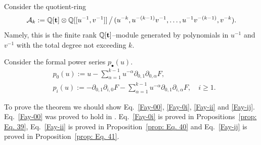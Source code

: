 \documentclass[12pt,a4paper]{amsart}
\newcommand{\QQ}{{\mathbb{Q}}}
\def\A{{\mathcal A}}
\newcommand{\p}{{\partial}}
\newcommand{\<}{\left<}
\renewcommand{\>}{\right>}
\newcommand{\bt}{{\bf t}}
\numberwithin{equation}{section}
\begin{document}
Consider the quotient-ring 
\[ 
\A_k := \QQ[\bt]\otimes\QQ[[u^{-1},v^{-1}]]\, \big/\, (u^{-k},u^{-(k-1)}v^{-1},  \dots, u^{-1}v^{-(k-1)},v^{-k}).
\]
Namely, this is the finite rank $\QQ[\bt]$--module generated by polynomials in $u^{-1}$ and $v^{-1}$ with the total degree not exceeding $k$.

Consider the formal power series $p_\bullet(u)$.
\begin{align}
    &p_0(u) := u - \sum_{\alpha=1}^{k-1} u^{-\alpha} \p_{0,1}\p_{0,\alpha}F,
    \\
    &p_i (u) := -\p_{0,1}\p_{i,0}F  - \sum_{\alpha=1}^{k-1} u^{-\alpha} \p_{0,1}\p_{i,\alpha}F , \quad i \ge 1.
\end{align}

To prove the theorem we should show Eq.~\eqref{Fay-00}, \eqref{Fay-0i}, \eqref{Fay-ii} and \eqref{Fay-ij}.
Eq.~\eqref{Fay-00} was proved to hold in \cite{BDbN}.
Eq.~\eqref{Fay-0i} is proved in Propositions~\ref{prop: Eq. 39}, Eq.~\eqref{Fay-ii} is proved in Proposition~\ref{prop: Eq. 40} and Eq.~\eqref{Fay-ij} is proved in Proposition~\ref{prop: Eq. 41}.
\end{document}

